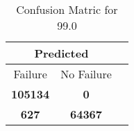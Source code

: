 \begin{table}[] 
\caption{Confusion Matric for 99.0} 
\label{Table: Prediction Accuracy-DMD99.0OnlySunEKF-combinationReflectionperfectNoFailurePrediction-Reflection} 
\centering 
\begin{tabular} 
 {@{}ccc@{}} 
\toprule 
\multicolumn{2}{c}{\textbf{Predicted}}
 \\ \midrule 
\multicolumn{1}{|c|}{Failure} & 
\multicolumn{1}{c|}{No Failure}
 \\ \midrule 
\multicolumn{1}{|c|}{\color{green}\textbf{105134}} & 
\multicolumn{1}{c|}{\color{red}\textbf{0}}
 \\ \midrule 
\multicolumn{1}{|c|}{\color{red}\textbf{627}} & 
\multicolumn{1}{c|}{\color{green}\textbf{64367}}
 \\ \bottomrule 
\end{tabular} 
\end{table} 
